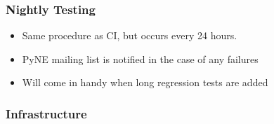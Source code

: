 \documentclass[12pt]{beamer}
\begin{document}
\begin{frame}
\frametitle{Nightly Testing}

\begin{itemize}
\item{Same procedure as CI, but occurs every 24 hours.}
\item{PyNE mailing list is notified in the case of any failures}
\item{Will come in handy when long regression tests are added}
\end{itemize}


\end{frame}

\begin{frame}
\frametitle{Infrastructure}


\end{frame}
\end{document}
